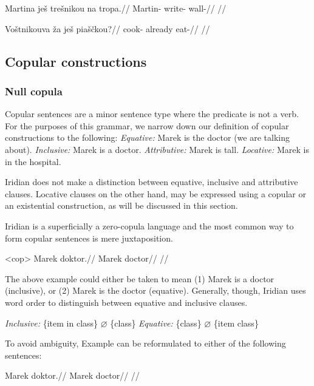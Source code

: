 \pex
\begingl
\gla Martina ješ trešnikou na tropa.//
\glb Martin-\Acc{} \Exst{} write- \Loc{} wall-\Acc{}//
\glft {}//
\endgl
\xe

\pex
\begingl
\gla Voštnikouva ža ješ piaščkou?//
\glb cook- already \Exst{} eat-//
\glft {}//
\endgl
\xe

\subsection{Copular constructions}
\subsubsection{Null copula}

Copular sentences are a minor sentence type where the predicate is not a verb. For the purposes of this grammar, we narrow down our definition of copular constructions to the following:
\pex
\a \textit{Equative:} Marek is the doctor (we are talking about).
\a \textit{Inclusive:} Marek is a doctor.
\a \textit{Attributive:} Marek is tall.
\a \textit{Locative:} Marek is in the hospital.
\xe

Iridian does not make a distinction between equative, inclusive and attributive clauses. Locative clauses on the other hand, may be expressed using a copular or an existential construction, as will be discussed in this section.

Iridian is a superficially a zero-copula language and the most common way to form copular sentences is mere juxtaposition.

\pex<cop>
\begingl
\gla Marek doktor.//
\glb Marek doctor//
\glft {}//
\endgl
\xe

The above example could either be taken to mean (1) Marek is a doctor (inclusive), or (2) Marek is the doctor (equative). Generally, though, Iridian uses word order to distinguish between equative and inclusive clauses.

\pex
\a \textit{Inclusive:} \{item in class\} $\varnothing$ \{class\}
\a \textit{Equative:} \{class\} $\varnothing$ \{item class\}
\xe

To avoid ambiguity, Example  can be reformulated to either of the following sentences:

\a
\begingl
\gla Marek doktor.//
\glb Marek doctor//
\glft {}//
\endgl

